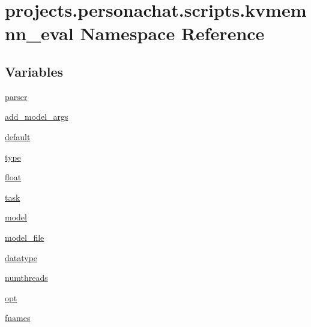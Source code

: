 \hypertarget{namespaceprojects_1_1personachat_1_1scripts_1_1kvmemnn__eval}{}\section{projects.\+personachat.\+scripts.\+kvmemnn\+\_\+eval Namespace Reference}
\label{namespaceprojects_1_1personachat_1_1scripts_1_1kvmemnn__eval}
\subsection*{Variables}
\begin{DoxyCompactItemize}
\item 
\hyperlink{namespaceprojects_1_1personachat_1_1scripts_1_1kvmemnn__eval_a63fe5b651c3e9e6afbb51c841fc6f1df}{parser}
\item 
\hyperlink{namespaceprojects_1_1personachat_1_1scripts_1_1kvmemnn__eval_a946f577f736f403b5886b3566649591f}{add\+\_\+model\+\_\+args}
\item 
\hyperlink{namespaceprojects_1_1personachat_1_1scripts_1_1kvmemnn__eval_a00f2399fa8227f1aa1a5ed312f25d5c8}{default}
\item 
\hyperlink{namespaceprojects_1_1personachat_1_1scripts_1_1kvmemnn__eval_a52b955236005ddbf4e85e792147db317}{type}
\item 
\hyperlink{namespaceprojects_1_1personachat_1_1scripts_1_1kvmemnn__eval_a6350a0ff855257ed96d21e4d106fbd73}{float}
\item 
\hyperlink{namespaceprojects_1_1personachat_1_1scripts_1_1kvmemnn__eval_a6e5f8bf0441a5997080dee205e000dc2}{task}
\item 
\hyperlink{namespaceprojects_1_1personachat_1_1scripts_1_1kvmemnn__eval_a039499ae0f4b08487772005a13cefd6e}{model}
\item 
\hyperlink{namespaceprojects_1_1personachat_1_1scripts_1_1kvmemnn__eval_a82dc6e9e0e060830201c7fb644688813}{model\+\_\+file}
\item 
\hyperlink{namespaceprojects_1_1personachat_1_1scripts_1_1kvmemnn__eval_aa3e724729da04451069b3e08c518e90e}{datatype}
\item 
\hyperlink{namespaceprojects_1_1personachat_1_1scripts_1_1kvmemnn__eval_a80fb6607eb5d3215816b9bc306906fd5}{numthreads}
\item 
\hyperlink{namespaceprojects_1_1personachat_1_1scripts_1_1kvmemnn__eval_a326a8f5dac63a35017b573e99d1653bc}{opt}
\item 
\hyperlink{namespaceprojects_1_1personachat_1_1scripts_1_1kvmemnn__eval_aa8075948f352375967e89a9ba38375dc}{fnames}
\end{DoxyCompactItemize}


